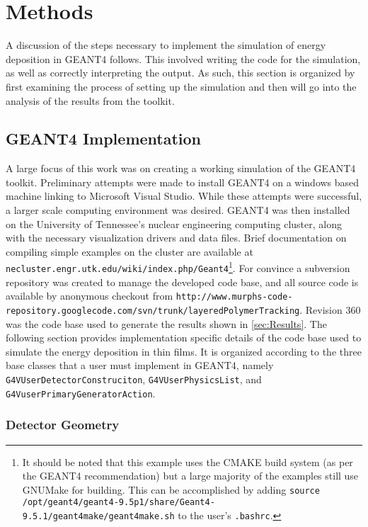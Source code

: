 \section{Methods}
\label{sec:Methods}

A discussion of the steps necessary to implement the simulation of energy deposition in GEANT4 follows.
This involved writing the code for the simulation, as well as correctly interpreting the output.
As such, this section is organized by first examining the process of setting up the simulation and then will go into the analysis of the results from the toolkit.
\subsection{GEANT4 Implementation}

A large focus of this work was on creating a working simulation of the GEANT4 toolkit.
Preliminary attempts were made to install GEANT4 on a windows based machine linking to Microsoft Visual Studio. While these attempts were successful, a larger scale computing environment was desired.
GEANT4 was then installed on the University of Tennessee's nuclear engineering computing cluster, along with the necessary visualization drivers and data files.
Brief documentation on compiling simple examples on the cluster are available at \texttt{necluster.engr.utk.edu/wiki/index.php/Geant4}\footnote{It should be noted that this example uses the CMAKE build system (as per the GEANT4 recommendation) but a large majority of the examples still use GNUMake for building. This can be accomplished by adding \verb+source /opt/geant4/geant4-9.5p1/share/Geant4-9.5.1/geant4make/geant4make.sh+ to the user's \verb+.bashrc+.}. 
For convince a subversion repository was created to manage the developed code base, and all source code is available by anonymous checkout from \texttt{http://www.murphs-code-repository.googlecode.com/svn/trunk/layeredPolymerTracking}. Revision 360 was the code base used to generate the results shown in \ref{sec:Results}.
The following section provides implementation specific details of the code base used to simulate the energy deposition in thin films.
It is organized according to the three base classes that a user must implement in GEANT4, namely \verb+G4VUserDetectorConstruciton+, \verb+G4VUserPhysicsList+, and \verb+G4VuserPrimaryGeneratorAction+.
\subsubsection{Detector Geometry}

